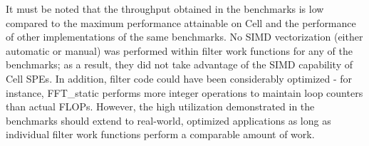It must be noted that the throughput obtained in the benchmarks is low
compared to the maximum performance attainable on Cell and the performance of other
implementations of the same benchmarks.
No SIMD vectorization (either automatic or manual) was performed within
filter work functions for any of the benchmarks;
as a result, they did not take advantage of the SIMD capability of Cell SPEs.
In addition, filter code could have been considerably optimized - for instance,
\textsf{FFT\_static} performs more integer operations to maintain loop counters than actual FLOPs.
However, the high utilization demonstrated in the benchmarks should extend to
real-world, optimized applications as long as individual filter work functions
perform a comparable amount of work.
